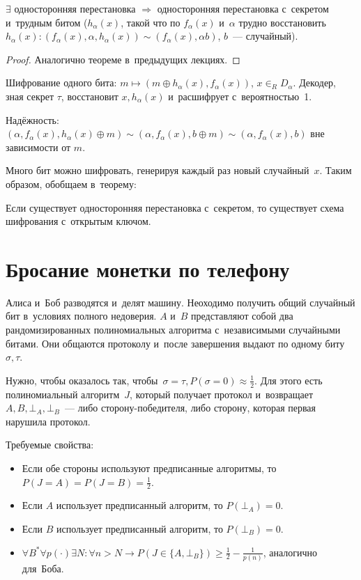 \documentclass{article}
\begin{document}
\begin{theorem}
	$\exists$ односторонняя перестановка $\Rightarrow$ односторонняя перестановка
	с~секретом и~трудным битом ($h_\alpha(x)$, такой что по $f_\alpha(x)$
	и~$\alpha$ трудно восстановить $h_\alpha(x): (f_\alpha(x), \alpha,
	h_\alpha(x)) \sim (f_\alpha(x), \alpha b)$, $b$~--- случайный).
\end{theorem}
\begin{proof}
	Аналогично теореме в~предыдущих лекциях.
\end{proof}

Шифрование одного бита: $m \mapsto (m \oplus h_\alpha(x), f_\alpha(x))$, $x
\in_R D_\alpha$. Декодер, зная секрет $\tau$, восстановит $x, h_\alpha(x)$
и~расшифрует с~вероятностью~1.

Надёжность: $(\alpha, f_\alpha(x), h_\alpha(x) \oplus m) \sim (\alpha,
f_\alpha(x), b \oplus m) \sim (\alpha, f_\alpha(x), b)$ вне зависимости от $m$.

Много бит можно шифровать, генерируя каждый раз новый случайный~$x$. Таким
образом, обобщаем в~теорему:

\begin{theorem}
	Если существует односторонняя перестановка с~секретом, то существует схема
	шифрования с~открытым ключом.
\end{theorem}

\section{Бросание монетки по телефону}

Алиса и~Боб разводятся и~делят машину. Неоходимо получить общий случайный бит
в~условиях полного недоверия. $A$ и~$B$ представляют собой два рандомизированных
полиномиальных алгоритма с~независимыми случайными битами. Они общаются
протоколу и~после завершения выдают по одному биту~$\sigma, \tau$.

Нужно, чтобы оказалось так, чтобы~$\sigma = \tau, P(\sigma = 0) \approx
\frac{1}{2}$. Для этого есть полиномиальный алгоритм~$J$, который получает
протокол и~возвращает~$A, B, \bot_A, \bot_B$~--- либо сторону-победителя, либо
сторону, которая первая нарушила протокол.

Требуемые свойства:
\begin{itemize}
	\item Если обе стороны используют предписанные алгоритмы, то $P(J = A) = P(J =
		B) = \frac{1}{2}$.
	\item Если $A$ использует предписанный алгоритм, то $P(\bot_A) = 0$.
	\item Если $B$ использует предписанный алгоритм, то $P(\bot_B) = 0$.
	\item $\forall B^\ast \forall p(\cdot) \exists N: \forall n > N \rightarrow
		P(J \in \{A, \bot_B\}) \ge \frac{1}{2} - \frac{1}{p(n)}$, аналогично
		для~Боба.
\end{itemize}
\end{document}
